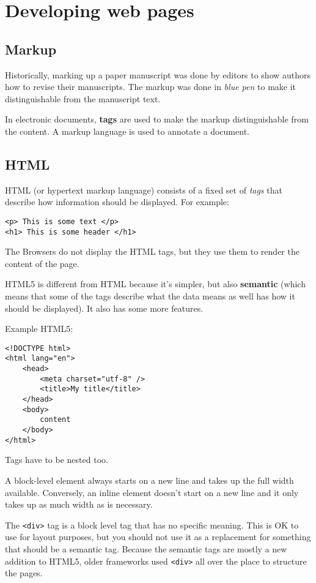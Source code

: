 \documentclass[11pt,a4paper,titlepage,dvipsnames,cmyk]{scrartcl}
\begin{document}
\section{Developing web pages}%
\label{sec:web-pages}

\subsection{Markup}%
\label{sub:Markup}
Historically, marking up a paper manuscript was done by editors to show
authors how to revise their manuscripts. The markup was done in
\textit{blue pen} to make it distinguishable from the manuscript text.

In electronic documents, \textbf{tags} are used to make the markup
distinguishable from the content. A markup language is used to annotate a
document.

\subsection{HTML}%
\label{sub:HTML}
HTML (or hypertext markup language) consists of a fixed set of
\textit{tags} that describe how information should be displayed. For
example:
\begin{lstlisting}
<p> This is some text </p>
<h1> This is some header </h1>
\end{lstlisting}

The Browsers do not display the HTML tags, but they use them to render the
content of the page.

HTML5 is different from HTML because it's simpler, but also \textbf{semantic}
(which means that some of the tags describe what the data means as well
has how it should be displayed). It also has some more features.

Example HTML5:
\begin{lstlisting}[]
<!DOCTYPE html>
<html lang="en">
    <head>
        <meta charset="utf-8" />
        <title>My title</title>
    </head>
    <body>
        content
    </body>
</html>
\end{lstlisting}

Tags have to be nested too.

A block-level element always starts on a new line and takes up the full
width available. Conversely, an inline element doesn't start on a new line
and it only takes up as much width as is necessary.

The \lstinline{<div>} tag is a block level tag that has no specific
meaning. This is OK to use for layout purposes, but you should not use it
as a replacement for something that should be a semantic tag. Because the
semantic tags are mostly a new addition to HTML5, older frameworks used
\lstinline{<div>} all over the place to structure the pages.
\end{document}
